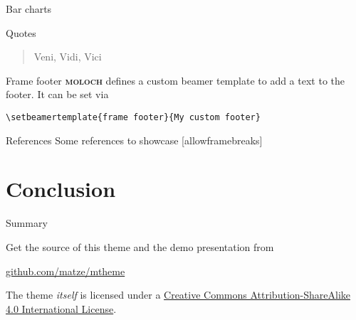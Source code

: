 \documentclass[10pt]{beamer}
\newcommand{\themename}{\textbf{\textsc{moloch}}\xspace}
\begin{document}
\begin{frame}{Bar charts}
  \begin{figure}
  \end{figure}
\end{frame}
\begin{frame}{Quotes}
  \begin{quote}
    Veni, Vidi, Vici
  \end{quote}
\end{frame}

{%
\begin{frame}[fragile]{Frame footer}
  \themename defines a custom beamer template to add a text to the footer. It can be set via
  \begin{verbatim}\setbeamertemplate{frame footer}{My custom footer}\end{verbatim}
\end{frame}
}

\begin{frame}{References}
  Some references to showcase [allowframebreaks] \cite{Knuth92,ConcreteMath,Simpson,Er01,greenwade93}
\end{frame}

\section{Conclusion}

\begin{frame}{Summary}

  Get the source of this theme and the demo presentation from

  \begin{center}\url{github.com/matze/mtheme}\end{center}

  The theme \emph{itself} is licensed under a
  \href{http://creativecommons.org/licenses/by-sa/4.0/}{Creative Commons
    Attribution-ShareAlike 4.0 International License}.

  \begin{center}\ccbysa\end{center}

\end{frame}
\end{document}
